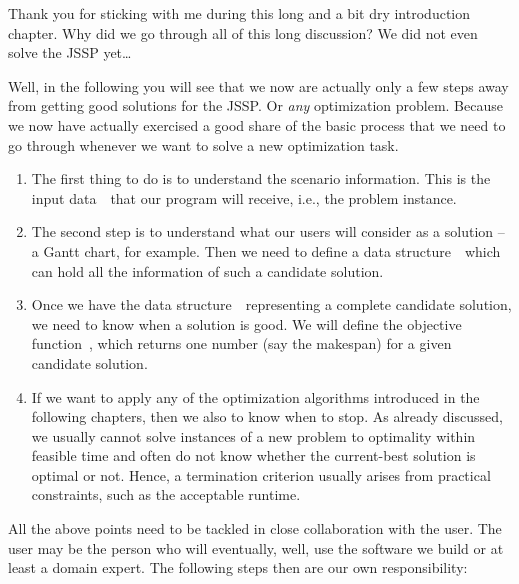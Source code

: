 %
%
Thank you for sticking with me during this long and a bit dry introduction chapter.
Why did we go through all of this long discussion?
We did not even solve the \gls{JSSP} yet{\dots}

Well, in the following you will see that we now are actually only a few steps away from getting good solutions for the \gls{JSSP}.
Or \emph{any} optimization problem.
Because we now have actually exercised a good share of the basic process that we need to go through whenever we want to solve a new optimization task.%
%
\begin{enumerate}%
%
\item The first thing to do is to understand the scenario information.
This is the input data~\instance\ that our program will receive, i.e., the problem instance.%
%
\item The second step is to understand what our users will consider as a solution -- a Gantt chart, for example.
Then we need to define a data structure~\solutionSpace\ which can hold all the information of such a candidate solution.%
%
\item Once we have the data structure~\solutionSpace\ representing a complete candidate solution, we need to know when a solution is good.
We will define the objective function~\objf, which returns one number (say the makespan) for a given candidate solution.%
%
\item If we want to apply any of the optimization algorithms introduced in the following chapters, then we also to know when to stop.
As already discussed, we usually cannot solve instances of a new problem to optimality within feasible time and often do not know whether the current-best solution is optimal or not.
Hence, a termination criterion usually arises from practical constraints, such as the acceptable runtime.%
%
\end{enumerate}%
%
All the above points need to be tackled in close collaboration with the user.
The user may be the person who will eventually, well, use the software we build or at least a domain expert.
The following steps then are our own responsibility:%
%
